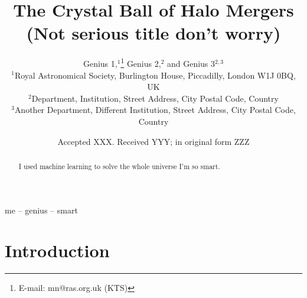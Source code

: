 \documentclass[fleqn,usenatbib]{mnras}
\title[Abbie=Smart Person]{The Crystal Ball of Halo Mergers (Not serious title don't worry)}
\author[K. T. Smith et al.]{
Genius 1,$^{1}$\thanks{E-mail: mn@ras.org.uk (KTS)}
Genius 2,$^{2}$
and Genius 3$^{2,3}$
\\
$^{1}$Royal Astronomical Society, Burlington House, Piccadilly, London W1J 0BQ, UK\\
$^{2}$Department, Institution, Street Address, City Postal Code, Country\\
$^{3}$Another Department, Different Institution, Street Address, City Postal Code, Country
}
\date{Accepted XXX. Received YYY; in original form ZZZ}
\begin{document}
\label{firstpage}
\pagerange{\pageref{firstpage}--\pageref{lastpage}}
\maketitle

\begin{abstract}
I used machine learning to solve the whole universe I'm so smart.
\end{abstract}

\begin{keywords}
me -- genius -- smart
\end{keywords}



\section{Introduction}
\end{document}
